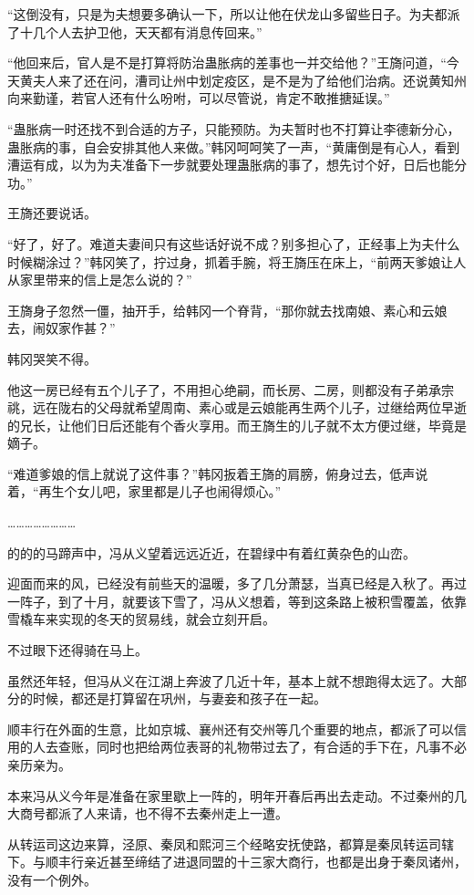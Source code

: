 “这倒没有，只是为夫想要多确认一下，所以让他在伏龙山多留些日子。为夫都派了十几个人去护卫他，天天都有消息传回来。”

“他回来后，官人是不是打算将防治蛊胀病的差事也一并交给他？”王旖问道，“今天黄夫人来了还在问，漕司让州中划定疫区，是不是为了给他们治病。还说黄知州向来勤谨，若官人还有什么吩咐，可以尽管说，肯定不敢推搪延误。”

“蛊胀病一时还找不到合适的方子，只能预防。为夫暂时也不打算让李德新分心，蛊胀病的事，自会安排其他人来做。”韩冈呵呵笑了一声，“黄庸倒是有心人，看到漕运有成，以为为夫准备下一步就要处理蛊胀病的事了，想先讨个好，日后也能分功。”

王旖还要说话。

“好了，好了。难道夫妻间只有这些话好说不成？别多担心了，正经事上为夫什么时候糊涂过？”韩冈笑了，拧过身，抓着手腕，将王旖压在床上，“前两天爹娘让人从家里带来的信上是怎么说的？”

王旖身子忽然一僵，抽开手，给韩冈一个脊背，“那你就去找南娘、素心和云娘去，闹奴家作甚？”

韩冈哭笑不得。

他这一房已经有五个儿子了，不用担心绝嗣，而长房、二房，则都没有子弟承宗祧，远在陇右的父母就希望周南、素心或是云娘能再生两个儿子，过继给两位早逝的兄长，让他们日后还能有个香火享用。而王旖生的儿子就不太方便过继，毕竟是嫡子。

“难道爹娘的信上就说了这件事？”韩冈扳着王旖的肩膀，俯身过去，低声说着，“再生个女儿吧，家里都是儿子也闹得烦心。”

……………………

的的的马蹄声中，冯从义望着远远近近，在碧绿中有着红黄杂色的山峦。

迎面而来的风，已经没有前些天的温暖，多了几分萧瑟，当真已经是入秋了。再过一阵子，到了十月，就要该下雪了，冯从义想着，等到这条路上被积雪覆盖，依靠雪橇车来实现的冬天的贸易线，就会立刻开启。

不过眼下还得骑在马上。

虽然还年轻，但冯从义在江湖上奔波了几近十年，基本上就不想跑得太远了。大部分的时候，都还是打算留在巩州，与妻妾和孩子在一起。

顺丰行在外面的生意，比如京城、襄州还有交州等几个重要的地点，都派了可以信用的人去查账，同时也把给两位表哥的礼物带过去了，有合适的手下在，凡事不必亲历亲为。

本来冯从义今年是准备在家里歇上一阵的，明年开春后再出去走动。不过秦州的几大商号都派了人来请，也不得不去秦州走上一遭。

从转运司这边来算，泾原、秦凤和熙河三个经略安抚使路，都算是秦凤转运司辖下。与顺丰行亲近甚至缔结了进退同盟的十三家大商行，也都是出身于秦凤诸州，没有一个例外。

